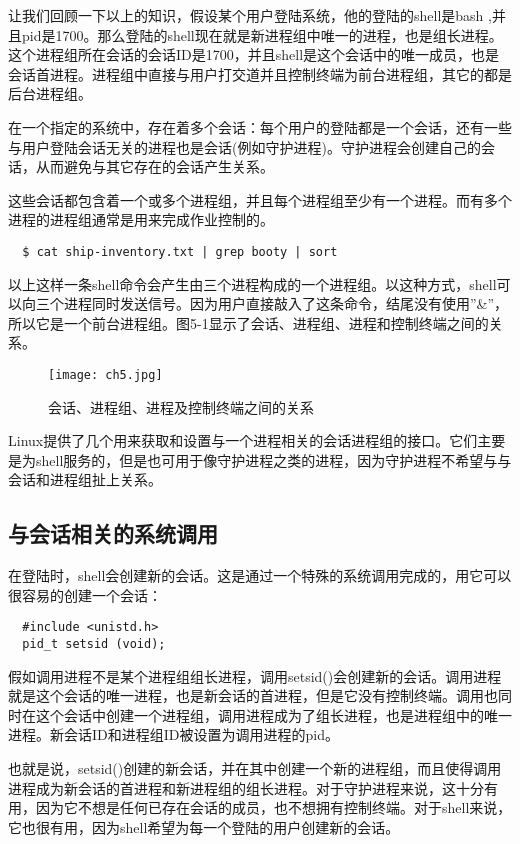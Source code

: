 让我们回顾一下以上的知识，假设某个用户登陆系统，他的登陆的shell是bash ,并且pid是1700。那么登陆的shell现在就是新进程组中唯一的进程，也是组长进程。这个进程组所在会话的会话ID是1700，并且shell是这个会话中的唯一成员，也是会话首进程。进程组中直接与用户打交道并且控制终端为前台进程组，其它的都是后台进程组。

在一个指定的系统中，存在着多个会话：每个用户的登陆都是一个会话，还有一些与用户登陆会话无关的进程也是会话(例如守护进程)。守护进程会创建自己的会话，从而避免与其它存在的会话产生关系。

这些会话都包含着一个或多个进程组，并且每个进程组至少有一个进程。而有多个进程的进程组通常是用来完成作业控制的。

\begin{verbatim}
  $ cat ship-inventory.txt | grep booty | sort
\end{verbatim}

以上这样一条shell命令会产生由三个进程构成的一个进程组。以这种方式，shell可以向三个进程同时发送信号。因为用户直接敲入了这条命令，结尾没有使用''\&''，所以它是一个前台进程组。图5-1显示了会话、进程组、进程和控制终端之间的关系。

\begin{figure}[htp]
  \centering
  \texttt{[image: ch5.jpg]}
  \caption{会话、进程组、进程及控制终端之间的关系}
\end{figure}
 
Linux提供了几个用来获取和设置与一个进程相关的会话进程组的接口。它们主要是为shell服务的，但是也可用于像守护进程之类的进程，因为守护进程不希望与与会话和进程组扯上关系。

\subsection{与会话相关的系统调用}

在登陆时，shell会创建新的会话。这是通过一个特殊的系统调用完成的，用它可以很容易的创建一个会话：

\begin{lstlisting}
  #include <unistd.h>
  pid_t setsid (void);
\end{lstlisting}

假如调用进程不是某个进程组组长进程，调用setsid()会创建新的会话。调用进程就是这个会话的唯一进程，也是新会话的首进程，但是它没有控制终端。调用也同时在这个会话中创建一个进程组，调用进程成为了组长进程，也是进程组中的唯一进程。新会话ID和进程组ID被设置为调用进程的pid。

也就是说，setsid()创建的新会话，并在其中创建一个新的进程组，而且使得调用进程成为新会话的首进程和新进程组的组长进程。对于守护进程来说，这十分有用，因为它不想是任何已存在会话的成员，也不想拥有控制终端。对于shell来说，它也很有用，因为shell希望为每一个登陆的用户创建新的会话。

